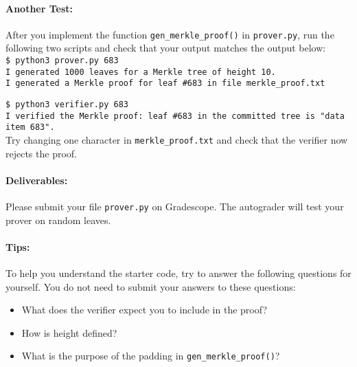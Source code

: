 \documentclass[11pt]{article}
\numberwithin{equation}{section}
\begin{document}
\paragraph{Another Test:} After you implement the function \texttt{gen\_merkle\_proof()} in \texttt{prover.py}, run the following two scripts and check that your output matches the output below:\\

\noindent\texttt{\$ python3 prover.py 683\\
\indent I generated 1000 leaves for a Merkle tree of height 10.\\
\indent I generated a Merkle proof for leaf \#683 in file merkle\_proof.txt\\}

\noindent\texttt{\$ python3 verifier.py 683\\
\indent I verified the Merkle proof: leaf \#683 in the committed tree is "data item 683".}\\

Try changing one character in \texttt{merkle\_proof.txt} and check that the verifier now rejects the proof.

\paragraph{Deliverables:} Please submit your file \texttt{prover.py} on Gradescope. The autograder will test your prover on random leaves.

\paragraph{Tips:} 
To help you understand the starter code, try to answer the following questions for yourself. You do not need to submit your answers to these questions:
    \begin{itemize}
        \item What does the verifier expect you to include in the proof?
        \item How is height defined?
        \item What is the purpose of the padding in \texttt{gen\_merkle\_proof()}?
    \end{itemize}
\end{document}
